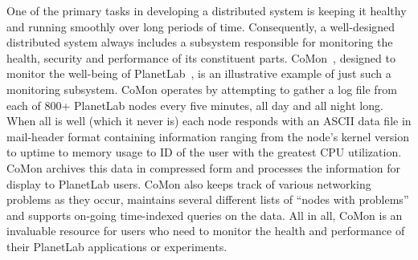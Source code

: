 



One of the primary tasks in developing
a distributed system is keeping it healthy and running smoothly over
long periods of time.  
Consequently, a well-designed distributed system always includes
a subsystem responsible for monitoring the health, security and
performance of its constituent parts.
CoMon~\cite{comon}, designed to monitor the well-being of 
PlanetLab~\cite{planetlab},
is an illustrative example of just such a monitoring subsystem.  CoMon
%
% 
operates by
attempting to gather a log file from each of 800+ PlanetLab nodes every
five minutes, all day and all night long.
When all is well (which it never is) each node responds with
an ASCII data file in mail-header format containing information
ranging from the node's kernel version to uptime to memory usage to
ID of the user with the greatest CPU utilization.  CoMon archives
this data in compressed form and processes the information
for display to PlanetLab users.  CoMon also keeps track of various
networking problems as they occur, maintains several different lists 
of ``nodes with problems'' and supports on-going time-indexed 
queries on the data.  All in all, CoMon is an invaluable resource for
users who need to monitor the health and performance of their
PlanetLab applications or experiments.

